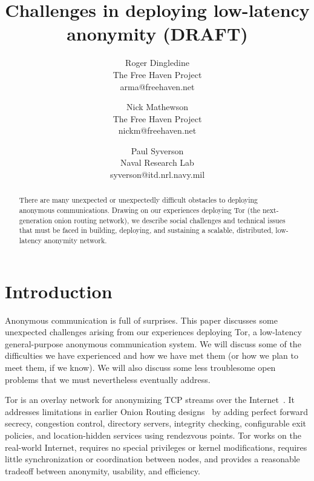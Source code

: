 \documentclass{llncs}
\begin{document}
\title{Challenges in deploying low-latency anonymity (DRAFT)}

\author{Roger Dingledine \\ The Free Haven Project \\ arma@freehaven.net \and
Nick Mathewson \\ The Free Haven Project \\ nickm@freehaven.net \and
Paul Syverson \\ Naval Research Lab \\ syverson@itd.nrl.navy.mil}

\maketitle
\pagestyle{empty}

\begin{abstract}
  There are many unexpected or unexpectedly difficult obstacles to
  deploying anonymous communications.  Drawing on our experiences deploying
  Tor (the next-generation onion routing network), we describe social
  challenges and technical issues that must be faced
  in building, deploying, and sustaining a scalable, distributed, low-latency
  anonymity network.
\end{abstract}

\section{Introduction}
Anonymous communication is full of surprises.  This paper discusses some
unexpected challenges arising from our experiences deploying Tor, a
low-latency general-purpose anonymous communication system.  We will discuss
some of the difficulties we have experienced and how we have met them (or how
we plan to meet them, if we know).  We will also discuss some less
troublesome open problems that we must nevertheless eventually address.

Tor is an overlay network for anonymizing TCP streams over the
Internet~\cite{tor-design}.  It addresses limitations in earlier Onion
Routing designs~\cite{or-ih96,or-jsac98,or-discex00,or-pet00} by adding
perfect forward secrecy, congestion control, directory servers, integrity
checking, configurable exit policies, and location-hidden services using
rendezvous points.  Tor works on the real-world Internet, requires no special
privileges or kernel modifications, requires little synchronization or
coordination between nodes, and provides a reasonable tradeoff between
anonymity, usability, and efficiency.
\end{document}
